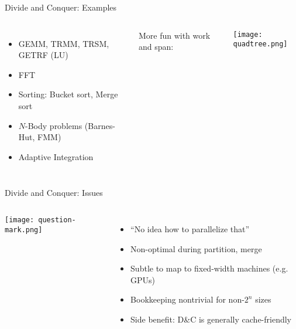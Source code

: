 \documentclass[english,compress]{beamer}
\begin{document}
\begin{frame}{Divide and Conquer: Examples}
  \begin{columns}
      \begin{itemize}
        \item GEMM, TRMM, TRSM, GETRF (LU)
        \item FFT
        \item Sorting: Bucket sort, Merge sort
        \item $N$-Body problems (Barnes-Hut, FMM)
        \item Adaptive Integration
      \end{itemize}

      More fun with work and span:

      \texttt{[image: quadtree.png]}
  \end{columns}
\end{frame}

\begin{frame}{Divide and Conquer: Issues}
  \begin{columns}
      \texttt{[image: question-mark.png]}
      \begin{itemize}
        \item ``No idea how to parallelize that''
        \item Non-optimal during partition, merge
        \item Subtle to map to fixed-width machines (e.g. GPUs)
        \item Bookkeeping nontrivial for non-$2^n$ sizes
        \item Side benefit: D\&C is generally cache-friendly
      \end{itemize}
  \end{columns}
\end{frame}
\end{document}
